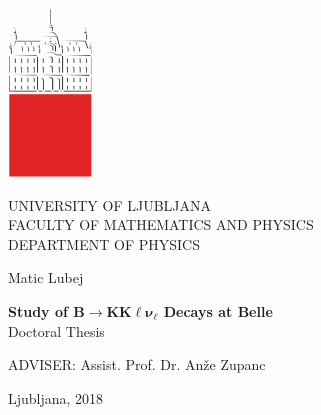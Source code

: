 \pagestyle{empty}
\begin{center}

\includegraphics{fig/logo2}

{\large UNIVERSITY OF LJUBLJANA\\
FACULTY OF MATHEMATICS AND PHYSICS\\
DEPARTMENT OF PHYSICS\\}

\vspace{5cm}

{\Large Matic Lubej\\}

\vspace{10mm}

{\bf \Large Study of $\bm{B \to K K \ell \nu_\ell}$ Decays at Belle\\}
\vspace{5mm}
{\large Doctoral Thesis}\\

\vfill

{\large ADVISER: Assist. Prof. Dr. An\v ze Zupanc\\
}

\vspace{2cm}
{\large Ljubljana, 2018}

\end{center}



